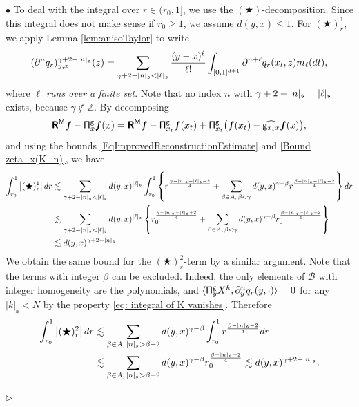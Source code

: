 \documentclass[10pt, reqno]{amsart}
\numberwithin{subsection}{section}
\numberwithin{subsubsection}{subsection}
\numberwithin{equation}{section} %
\newenvironment{Dem}[1][\unskip]{%
    \begin{list}{\hspace{1.15cm}{\sf \textbf{{\small Proof #1 --}}}}{%
        \setlength{\topsep}{0pt}%
        \setlength{\leftmargin}{0pt}%
        \setlength{\rightmargin}{0pt}%
        \setlength{\listparindent}{0pt}%
        \setlength{\itemindent}{0pt}%
        \setlength{\parsep}{0pt}%
        \addtolength{\leftmargin}{0pt}%
        \addtolength{\rightmargin}{0pt}%
    } \item }{\hfill $\rhd$\end{list}\smallskip}
\theoremstyle{mystyle}
\theoremstyle{mystyle2}
\theoremstyle{mystyle3}
\newcommand{\bsf}{\boldsymbol{f}}
\newcommand\bbZ{\mathbb{Z}}
\newcommand{\mcB}{\mathcal{B}}
\begin{document}
\begin{Dem}[of Theorem \ref{thm wellposedness of K}]
{$\bullet$ To deal with the integral over $r\in(r_0,1]$, we use the $(\bigstar)$-decomposition. Since this integral does not make sense if $r_0\ge1$, we assume $d(y,x)\le1$. For $(\bigstar)^1_r$, we apply Lemma \ref{lem:anisoTaylor} to write
\begin{align}\label{lem:anisoTaylorAppqr}
(\partial^n q_r)_{y,x}^{\gamma+2-|n|_{\frak{s}}}(z) =
\sum_{\gamma+2-|n|_{\frak{s}} < |\ell|_{\frak{s}} } \frac{(y-x)^\ell}{\ell!} \int_{[0,1]^{d+1}}\partial^{n+\ell} q_r(x_t,z)m_\ell(dt),
\end{align}
where {\it $\ell$ runs over a finite set}. Note that no index $n$ with $\gamma+2-|n|_{\frak{s}} = |\ell|_{\frak{s}}$ exists, because $\gamma\notin\bbZ$. By decomposing 
$$
\textbf{\textsf{R}}^{\sf M}\bsf - {\sf\Pi}_x^{\sf g}\bsf(x)=\textbf{\textsf{R}}^{\sf M}\bsf - {\sf\Pi}_{x_t}^{\sf g}\bsf(x_t)+{\sf\Pi}_{x_t}^{\sf g}\big(\bsf(x_t)-\widehat{{\sf g}_{x_t x}}\bsf(x)\big),
$$ 
and using the bounds \eqref{EqImprovedReconstructionEstimate} and \eqref{Bound zeta_x(K_n)}, we have
\begin{align*}
\int_{r_0}^1\big|(\bigstar)^1_r\big|\,dr
&\lesssim\sum_{\gamma+2-|n|_{\frak{s}} < |\ell|_{\frak{s}} }
d(y,x)^{|\ell|_{\frak{s}}}
\int_{r_0}^1\left\{r^{\frac{\gamma-|n|_{\frak{s}}-|\ell|_{\frak{s}}-2}{4}}
+\sum_{\beta\in A,\,\beta<\gamma} d(y,x)^{\gamma-\beta} r^{\frac{\beta-|n|_{\frak{s}}-|\ell|_{\frak{s}}-2}{4}}\right\} dr   \\
&\lesssim\sum_{\gamma+2-|n|_{\frak{s}} < |\ell|_{\frak{s}} }
d(y,x)^{|\ell|_{\frak{s}}}
\left\{r_0^{\frac{\gamma-|n|_{\frak{s}}-|\ell|_{\frak{s}}+2}{4}}
+\sum_{\beta\in A,\,\beta<\gamma} d(y,x)^{\gamma-\beta} r_0^{\frac{\beta-|n|_{\frak{s}}-|\ell|_{\frak{s}}+2}{4}}\right\}   \\
&\lesssim d(y,x)^{\gamma+2-|n|_{\frak{s}}}.
\end{align*}
We obtain the same bound for the $(\bigstar)^2_r$-term by a similar argument. Note that the terms with integer $\beta$ can be excluded. Indeed, the only elements of $\mcB$ with integer homogeneity are the polynomials, and $\langle{\sf\Pi}_y^{\sf g}X^k,\partial_y^nq_r(y,\cdot)\rangle=0$ for any $|k|_{\mathfrak{s}}<N$ by the property \eqref{eq: integral of K vanishes}. Therefore
\begin{align*}
\int_{r_0}^1\big|(\bigstar)^2_r\big|\,dr
&\lesssim\sum_{\beta\in A,\, |n|_{\frak{s}} >\beta+2 }
d(y,x)^{\gamma-\beta}
\int_{r_0}^1r^{\frac{\beta-|n|_{\frak{s}}-2}4}dr   \\
&\lesssim\sum_{\beta\in A,\, |n|_{\frak{s}} >\beta+2 }
d(y,x)^{\gamma-\beta}r_0^{\frac{\beta-|n|_{\frak{s}}+2}4}   \lesssim d(y,x)^{\gamma+2-|n|_{\frak{s}}}.
\end{align*}

}
\end{Dem}
\end{document}
